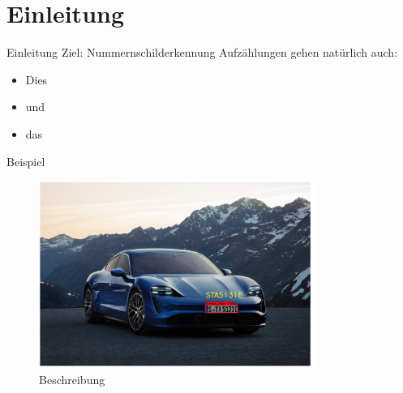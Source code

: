 \section{Einleitung}

\begin{frame}{Einleitung}
    Ziel: Nummernschilderkennung
    Aufz\"ahlungen gehen nat\"urlich auch:
    \begin{itemize}
        \item Dies
        \item und
        \item das
    \end{itemize}
\end{frame}

\begin{frame}{Beispiel}
    \begin{figure}
        \includegraphics[width=0.8\textwidth]{bilder/Bild2.jpg}
        \caption{Beschreibung}
    \end{figure}
\end{frame}
